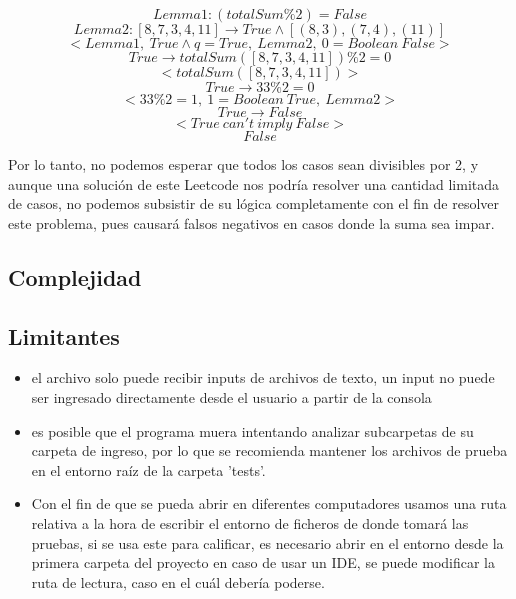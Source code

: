 \documentclass[a4paper]{article}
\begin{document}
    $$Lemma 1: (totalSum\%2) = False $$
    $$Lemma 2: [8, 7, 3, 4, 11] \rightarrow True \land [(8,3),(7,4),(11)] $$
    $$< Lemma 1, \ True \land q = True, \ Lemma 2, \ 0 = Boolean \ False >$$ 
    $$  True \rightarrow totalSum([8, 7, 3, 4, 11])\%2 = 0$$
    $$<totalSum([8, 7, 3, 4, 11])>$$ 
    $$True \rightarrow 33\%2 = 0$$
    $$<33\%2 = 1 , \ 1 = Boolean \ True, \ Lemma 2>$$ 
    $$True \rightarrow False$$
    $$<True \ can't \ imply \ False>$$
    $$False$$

Por lo tanto, no podemos esperar que todos los casos sean divisibles por 2, y aunque
una solución de este Leetcode nos podría resolver una cantidad limitada de casos, no podemos
subsistir de su lógica completamente con el fin de resolver este problema, pues causará 
falsos negativos en casos donde la suma sea impar.

\subsection{Complejidad}
\subsection{Limitantes}
    \begin{itemize}
        \item el archivo solo puede recibir inputs de archivos de texto, un input no
        puede ser ingresado directamente desde el usuario a partir de la consola
        \item es posible que el programa muera intentando analizar subcarpetas de su carpeta
        de ingreso, por lo que se recomienda mantener los archivos de prueba en el entorno
        raíz de la carpeta 'tests'.
        \item Con el fin de que se pueda abrir en diferentes computadores usamos una ruta relativa
        a la hora de escribir el entorno de ficheros de donde tomará las pruebas, si se usa este 
        para calificar, es necesario abrir en el entorno desde la primera carpeta del proyecto en
        caso de usar un IDE, se puede modificar la ruta de lectura, caso en el cuál debería poderse. 
    \end{itemize}
\end{document}
